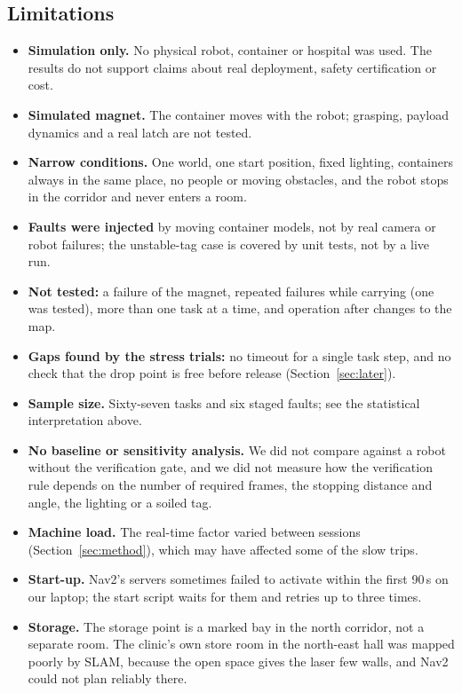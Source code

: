 \documentclass[conference]{IEEEtran}
\begin{document}
\subsection{Limitations}\label{sec:limits}
\begin{itemize}
\item \textbf{Simulation only.} No physical robot, container or hospital was used. The results do not support claims about real deployment, safety certification or cost.
\item \textbf{Simulated magnet.} The container moves with the robot; grasping, payload dynamics and a real latch are not tested.
\item \textbf{Narrow conditions.} One world, one start position, fixed lighting, containers always in the same place, no people or moving obstacles, and the robot stops in the corridor and never enters a room.
\item \textbf{Faults were injected} by moving container models, not by real camera or robot failures; the unstable-tag case is covered by unit tests, not by a live run.
\item \textbf{Not tested:} a failure of the magnet, repeated failures while carrying (one was tested), more than one task at a time, and operation after changes to the map.
\item \textbf{Gaps found by the stress trials:} no timeout for a single task step, and no check that the drop point is free before release (Section~\ref{sec:later}).
\item \textbf{Sample size.} Sixty-seven tasks and six staged faults; see the statistical interpretation above.
\item \textbf{No baseline or sensitivity analysis.} We did not compare against a robot without the verification gate, and we did not measure how the verification rule depends on the number of required frames, the stopping distance and angle, the lighting or a soiled tag.
\item \textbf{Machine load.} The real-time factor varied between sessions (Section~\ref{sec:method}), which may have affected some of the slow trips.
\item \textbf{Start-up.} Nav2's servers sometimes failed to activate within the first 90\,s on our laptop; the start script waits for them and retries up to three times.
\item \textbf{Storage.} The storage point is a marked bay in the north corridor, not a separate room. The clinic's own store room in the north-east hall was mapped poorly by SLAM, because the open space gives the laser few walls, and Nav2 could not plan reliably there.
\end{itemize}
\end{document}
